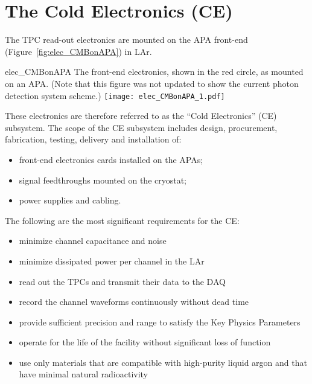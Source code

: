 \section{The Cold Electronics (CE)} 
\label{sec:detectors-fd-ref-ce}

The TPC read-out electronics are mounted on the APA front-end
(Figure~\ref{fig:elec_CMBonAPA}) in LAr.  
\begin{cdrfigure}{elec_CMBonAPA}
 {The front-end electronics, shown in the red circle, as mounted on an APA. (Note that this figure
 was not updated to show the current photon detection system scheme.)}
\texttt{[image: elec\_CMBonAPA\_1.pdf]}
\end{cdrfigure}
These electronics are
therefore referred to as the ``Cold Electronics'' (CE) subsystem.  The
scope of the CE subsystem includes design, procurement,
fabrication, testing, delivery and installation of:
\begin{itemize}
\item front-end electronics cards installed on the APAs;
\item signal feedthroughs mounted on the cryostat;
\item power supplies and cabling.
\end{itemize}
The following are the most significant requirements for the CE:
\begin{itemize}	
\item minimize channel capacitance and noise
\item minimize dissipated power per channel in the LAr
\item read out the TPCs and transmit their data to the DAQ
\item record the channel waveforms continuously without dead time
\item provide sufficient precision and range to satisfy the Key Physics Parameters
\item operate for the life of the facility without significant loss of function
\item use only materials that are compatible with high-purity liquid argon and that have minimal natural radioactivity
\end{itemize}

